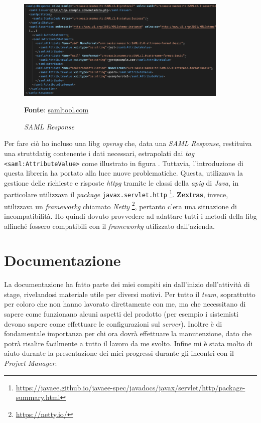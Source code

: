     \begin{figure}[ht]
        \centering
        \includegraphics[width=0.90\textwidth]{immagini/saml_response.png}
        \caption{\textit{SAML Response}}
        \textbf{Fonte}:
        \href{https://www.samltool.com/generic_sso_res.php}{samltool.com}
        \label{fig: SAML Response}
    \end{figure}
    
Per fare ciò ho incluso una \gls{libg} \textit{\gls{opensg}} che, data una \textit{SAML Response}, restituiva una \gls{struttdatig} contenente i dati necessari, estrapolati dai \textit{tag} \texttt{<saml:AttributeValue>} come illustrato in figura .
Tuttavia, l'introduzione di questa libreria ha portato alla luce nuove problematiche. Questa, utilizzava la gestione delle richieste e risposte \textit{\gls{httpg}} tramite le classi della \textit{\gls{apig}} di \textit{Java}, in particolare utilizzava il \textit{package} \texttt{javax.servlet.http} \footnote{\url{https://javaee.github.io/javaee-spec/javadocs/javax/servlet/http/package-summary.html}}. \textbf{Zextras}, invece, utilizzava un \textit{\gls{frameworkg}} chiamato \textit{Netty} \footnote{\url{https://netty.io/}}, pertanto c'era una situazione di incompatibilità. Ho quindi dovuto provvedere ad adattare tutti i metodi della \gls{libg} affinché fossero compatibili con il \textit{\gls{frameworkg}} utilizzato dall'azienda. \\

\section{Documentazione}
La documentazione ha fatto parte dei miei compiti sin dall'inizio dell'attività di stage, rivelandosi materiale utile per diversi motivi. Per tutto il \textit{team}, soprattutto per coloro che non hanno lavorato direttamente con me, ma che necessitano di sapere come funzionano alcuni aspetti del prodotto (per esempio i sistemisti devono sapere come effettuare le configurazioni sul \textit{server}). Inoltre è di fondamentale importanza per chi ora dovrà effettuare la manutenzione, dato che potrà risalire facilmente a tutto il lavoro da me svolto. Infine mi è stata molto di aiuto durante la presentazione dei miei progressi durante gli incontri con il \textit{Project Manager}.

